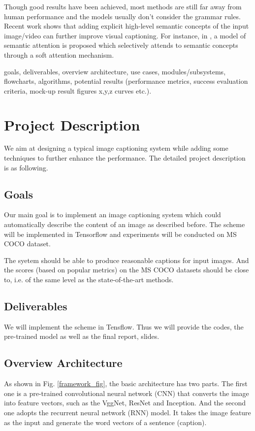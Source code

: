 \documentclass[conference]{IEEEtran}
\begin{document}
Though good results have been achieved, most methods are still far away from human performance and the models usually don't consider the grammar rules. Recent work shows that adding explicit high-level semantic concepts of the input image/video can further improve visual captioning. For instance, in \cite{you2016image}, a model of semantic attention is proposed which selectively attends to semantic concepts through a soft attention mechanism.

goals, deliverables, overview architecture, use cases, modules/subsystems, flowcharts, algorithms, potential results (performance metrics, success evaluation criteria, mock-up result figures x,y,z curves etc.).


\section{Project Description}
We aim at designing a typical image captioning system while adding some techniques to further enhance the performance. The detailed project description is as following.
\subsection{Goals}
Our main goal is to implement an image captioning system which could automatically describe the content of an image as described before. The scheme will be implemented in Tensorflow and experiments will be conducted on MS COCO dataset.

The syetem should be able to produce reasonable captions for input images. And the scores (based on popular metrics) on the MS COCO datasets should be close to, i.e. of the same level as the state-of-the-art methods.

\subsection{Deliverables}

We will implement the scheme in Tensflow. Thus we will provide the codes, the pre-trained model as well as the final report, slides.
\subsection{Overview Architecture}

As shown in Fig. \ref{framework_fig}, the basic architecture has two parts. The first one is a pre-trained convolutional neural network (CNN) that converts the image into feature vectors, such as the VggNet, ResNet and Inception. And the second one adopts the recurrent neural network (RNN) model. It takes the image feature as the input and generate the word vectors of a sentence (caption).
\end{document}
